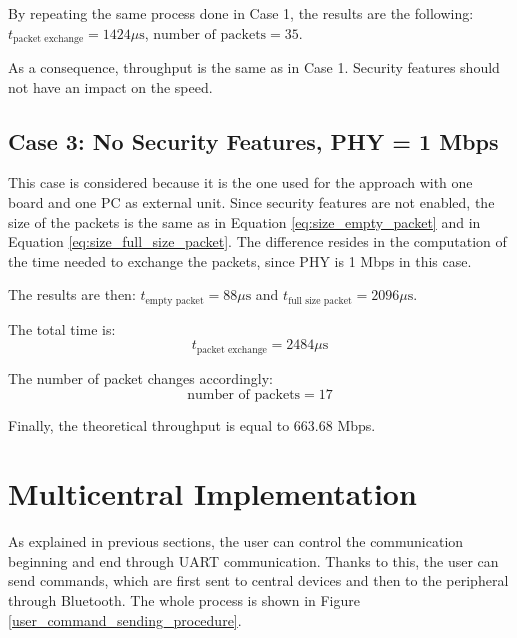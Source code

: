 \documentclass{Configuration_Files/PoliMi3i_thesis}
\begin{document}
By repeating the same process done in Case 1, the results are the following: $t_{\text{packet exchange}} = 1424 \mu \text{s}$, $\text{number of packets} = 35$.

As a consequence, throughput is the same as in Case 1. Security features should not have an impact on the speed.

\subsection*{Case 3: No Security Features, PHY = 1 Mbps}

This case is considered because it is the one used for the approach with one board and one PC as external unit. Since security features are not enabled, the size of the packets is the same as in Equation \ref{eq:size_empty_packet} and in Equation \ref{eq:size_full_size_packet}. The difference resides in the computation of the time needed to exchange the packets, since PHY is 1 Mbps in this case.

The results are then: $t_{\text{empty packet}} = 88 \mu \text{s}$ and $t_{\text{full size packet}} = 2096 \mu \text{s}$.

The total time is:
\begin{equation}
t_{\text{packet exchange}} = 2484 \mu \text{s}
\label{eq:packet_exchange_case3}
\end{equation}

The number of packet changes accordingly:
\begin{equation}
\text{number of packets} = 17
\label{eq:number_of_packets_case3}
\end{equation}

Finally, the theoretical throughput is equal to 663.68 Mbps.

\section{Multicentral Implementation}
As explained in previous sections, the user can control the communication beginning and end through UART communication. Thanks to this, the user can send commands, which are first sent to central devices and then to the peripheral through Bluetooth. The whole process is shown in Figure \ref{user_command_sending_procedure}.
\end{document}
